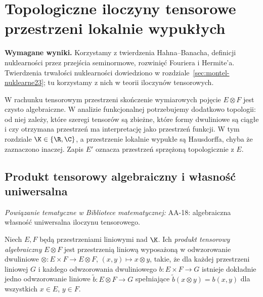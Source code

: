 
\section{Topologiczne iloczyny tensorowe przestrzeni lokalnie wypukłych}
\label{sec:tensor24}

\providecommand{\atlasref}[2]{#2}


\noindent\textbf{Wymagane wyniki.} Korzystamy z twierdzenia
Hahna--Banacha, definicji nuklearności przez przejścia seminormowe,
rozwinięć Fouriera i Hermite'a. Twierdzenia trwałości nuklearności
dowiedziono w rozdziale~\ref{sec:montel-nuklearne23}; tu korzystamy z nich
w teorii iloczynów tensorowych.
\medskip

W rachunku tensorowym przestrzeni skończenie wymiarowych pojęcie
$E\otimes F$ jest czysto algebraiczne. W analizie funkcjonalnej
potrzebujemy dodatkowo topologii: od niej zależy, które szeregi
tensorów są zbieżne, które formy dwuliniowe są ciągłe i czy
otrzymana przestrzeń ma interpretację jako przestrzeń funkcji.
W tym rozdziale $\K\in\{\R,\C\}$, a przestrzenie lokalnie wypukłe
są Hausdorffa, chyba że zaznaczono inaczej. Zapis $E'$ oznacza
przestrzeń sprzężoną topologicznie z $E$.

\subsection{Produkt tensorowy algebraiczny i własność uniwersalna}

\noindent\emph{Powiązanie tematyczne w Bibliotece matematycznej:} \atlasref{AA-18::aa:tw:tensor-universal}{AA-18: algebraiczna własność uniwersalna iloczynu tensorowego}.


\begin{definicja}
\label{def:alg-tensor24}
Niech $E,F$ będą przestrzeniami liniowymi nad $\K$.
Ich \emph{produkt tensorowy algebraiczny} $E\otimes F$ jest
przestrzenią liniową wyposażoną w odwzorowanie dwuliniowe
$\otimes:E\times F\to E\otimes F$, $ (x,y)\mapsto x\otimes y$,
takie, że dla każdej przestrzeni liniowej $G$ i każdego
odwzorowania dwuliniowego $b:E\times F\to G$ istnieje dokładnie
jedno odwzorowanie liniowe $\widetilde b:E\otimes F\to G$
spełniające $\widetilde b(x\otimes y)=b(x,y)$ dla wszystkich
$x\in E$, $y\in F$.
\end{definicja}

